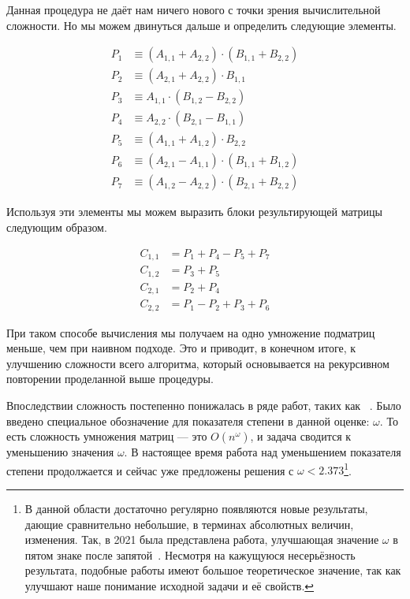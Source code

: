 Данная процедура не даёт нам ничего нового с точки зрения вычислительной сложности. Но мы можем двинуться дальше и определить следующие элементы.

\begin {align*}
P_1 & \equiv (A_{1,1} + A_{2,2}) \cdot (B_{1,1} + B_{2,2}) \\
P_2 & \equiv (A_{2,1} + A_{2,2}) \cdot B_{1,1} \\
P_3 & \equiv A_{1,1} \cdot (B_{1,2} - B_{2,2}) \\
P_4 & \equiv A_{2,2} \cdot (B_{2,1} - B_{1,1}) \\
P_5 & \equiv (A_{1,1} + A_{1,2}) \cdot B_{2,2}  \\
P_6 & \equiv (A_{2,1} - A_{1,1}) \cdot (B_{1,1} + B_{1,2}) \\
P_7 & \equiv (A_{1,2} - A_{2,2}) \cdot (B_{2,1} + B_{2,2})
\end {align*}

Используя эти элементы мы можем выразить блоки результирующей матрицы следующим образом.

\begin {align*}
C_{1,1} & = P_1 + P_4 - P_5 + P_7 \\
C_{1,2} & = P_3 + P_5 \\
C_{2,1} & = P_2 + P_4 \\
C_{2,2} & = P_1 - P_2 + P_3 + P_6
\end {align*}

При таком способе вычисления мы получаем на одно умножение подматриц меньше, чем при наивном подходе. Это и приводит, в конечном итоге, к улучшению сложности всего алгоритма, который основывается на рекурсивном повторении проделанной выше процедуры.

Впоследствии сложность постепенно понижалась в ряде работ, таких как ~\cite{Pan1978,BiniCapoRoma1979,Schonhage1981,CoppWino1982,CoppWino1990}. Было введено специальное обозначение для показателя степени в данной оценке: $\omega$. То есть сложность умножения матриц --- это $O(n^\omega)$, и задача сводится к уменьшению значения $\omega$. В настоящее время работа над уменьшением показателя степени продолжается и сейчас уже предложены решения с $\omega < 2.373$\footnote{В данной области достаточно регулярно появляются новые результаты, дающие сравнительно небольшие, в терминах абсолютных величин, изменения. Так, в 2021 была представлена работа, улучшающая значение $\omega$ в пятом знаке после запятой~\cite{alman2020refined}. Несмотря на кажущуюся несерьёзность результата, подобные работы имеют большое теоретическое значение, так как улучшают наше понимание исходной задачи и её свойств.}.

